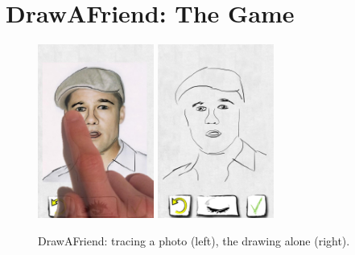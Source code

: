 \section{DrawAFriend: The Game}

\begin{figure}
  \centering%
\includegraphics[width=1.5in]{DaF/PicHand2.pdf}
\hspace{0.1in}
\includegraphics[width=1.5in]{DaF/IMG_3044.jpg}
  \caption{DrawAFriend: tracing a photo (left), the drawing alone (right).}
  \label{fig:DaF}
\end{figure}

